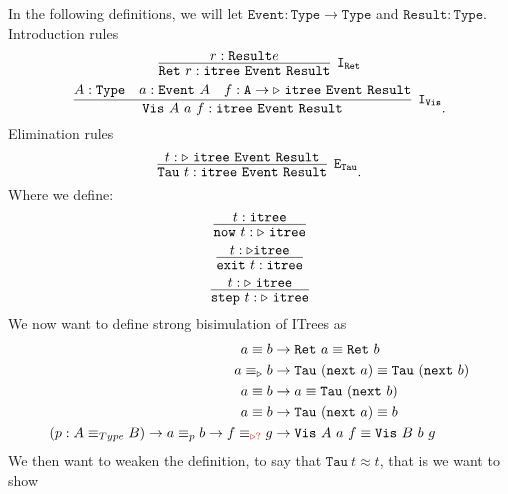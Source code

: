 \documentclass[twoside,11pt,openright]{report}
\begin{document}
In the following definitions, we will let \(\mathtt{Event} : \mathtt{Type} \rightarrow \mathtt{Type}\) and \(\mathtt{Result} : \mathtt{Type}\). \\ Introduction rules
\begin{equation}
  \infer [\mathtt{I}_\mathtt{Ret}]{\mathtt{Ret}~r : \mathtt{itree}~\mathtt{Event}~\mathtt{Result}}{r : \mathtt{Result}e}
\end{equation}
\begin{equation}
  \infer[\mathtt{I}_\mathtt{Vis}]{\mathtt{Vis}~A~a~f : \mathtt{itree}~\mathtt{Event}~\mathtt{Result}}{A : \mathtt{Type} & a : \mathtt{Event}~A & f : \mathtt{A} \rightarrow \triangleright~\mathtt{itree}~\mathtt{Event}~\mathtt{Result}}.
\end{equation}
Elimination rules
\begin{equation}
  \infer[\mathtt{E}_\mathtt{Tau}]{\mathtt{Tau}~t : \mathtt{itree}~\mathtt{Event}~\mathtt{Result}}{t : \triangleright~\mathtt{itree}~\mathtt{Event}~\mathtt{Result}}.
\end{equation}
Where we define:
\begin{equation}
  \infer{\mathtt{now}~t : \triangleright~\mathtt{itree}}{t : \mathtt{itree}}
\end{equation}
\begin{equation}
  \infer{\mathtt{exit}~t : \mathtt{itree}}{t : \triangleright \mathtt{itree}}
\end{equation}
\begin{equation}
  \infer{\mathtt{step}~t : \triangleright~\mathtt{itree}}{t : \triangleright~\mathtt{itree}}
\end{equation}
We now want to define strong bisimulation of ITrees as
\begin{align}
  a \equiv b &\rightarrow \mathtt{Ret}~a \equiv \mathtt{Ret}~b \label{eq:ret_path} \\
  a \equiv_{\triangleright} b &\rightarrow \mathtt{Tau}~(\mathtt{next}~a) \equiv \mathtt{Tau}~(\mathtt{next}~b) \label{eq:tau_path} \\
  a \equiv b &\rightarrow a \equiv \mathtt{Tau}~(\mathtt{next}~b) \label{eq:tau_r_path} \\
  a \equiv b &\rightarrow \mathtt{Tau}~(\mathtt{next}~a) \equiv b \label{eq:tau_l_path} \\
  (p : A \equiv_{Type} B) \rightarrow a \equiv_p b \rightarrow f \equiv_{\textcolor{red}{\triangleright?}} g &\rightarrow \mathtt{Vis}~A~a~f \equiv \mathtt{Vis}~B~b~g \label{eq:vis_path}
\end{align}
We then want to weaken the definition, to say that \(\mathtt{Tau}~t \approx t\), that is we want to show
\end{document}
